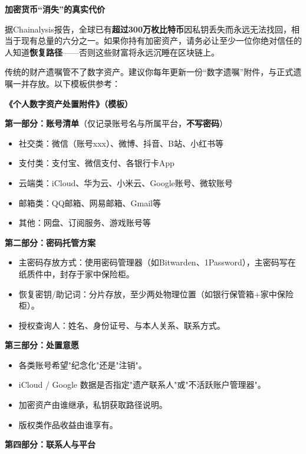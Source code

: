 \textbf{加密货币“消失”的真实代价}\par

据Chainalysis报告，全球已有\textbf{超过300万枚比特币}因私钥丢失而永远无法找回，相当于现有总量的六分之一。如果你持有加密资产，请务必让至少一位你绝对信任的人知道\textbf{恢复路径}——否则这些财富将永远沉睡在区块链上。


传统的财产遗嘱管不了数字资产。建议你每年更新一份“数字遗嘱”附件，与正式遗嘱一并存放。以下模板供参考：

\textbf{《个人数字资产处置附件》（模板）}\par

\textbf{第一部分：账号清单}（仅记录账号名与所属平台，\textbf{不写密码}）

\begin{itemize}
  \item 社交类：微信（账号xxx）、微博、抖音、B站、小红书等
  \item 支付类：支付宝、微信支付、各银行卡App
  \item 云端类：iCloud、华为云、小米云、Google账号、微软账号
  \item 邮箱类：QQ邮箱、网易邮箱、Gmail等
  \item 其他：网盘、订阅服务、游戏账号等
\end{itemize}

\textbf{第二部分：密码托管方案}

\begin{itemize}
  \item 主密码存放方式：使用密码管理器（如Bitwarden、1Password），主密码写在纸质件中，封存于家中保险柜。
  \item 恢复密钥/助记词：分片存放，至少两处物理位置（如银行保管箱+家中保险柜）。
  \item 授权查询人：姓名、身份证号、与本人关系、联系方式。
\end{itemize}

\textbf{第三部分：处置意愿}

\begin{itemize}
  \item 各类账号希望"纪念化"还是"注销"。
  \item iCloud / Google 数据是否指定"遗产联系人"或"不活跃账户管理器"。
  \item 加密资产由谁继承，私钥获取路径说明。
  \item 版权类作品收益由谁享有。
\end{itemize}

\textbf{第四部分：联系人与平台}

